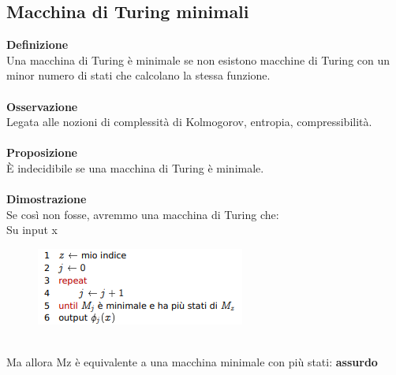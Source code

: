 \subsection{Macchina di Turing minimali}
\textbf{Definizione}\\
Una macchina di Turing è minimale se non esistono macchine di Turing con un minor numero di stati che calcolano la stessa funzione.\\\\
\textbf{Osservazione}\\
Legata alle nozioni di complessità di Kolmogorov, entropia, compressibilità.\\\\
\textbf{Proposizione}\\
È indecidibile se una macchina di Turing è minimale.\\\\
\textbf{Dimostrazione}\\
Se così non fosse, avremmo una macchina di Turing che:\\
Su input x
\begin{figure}[htp]
    \includegraphics[scale=0.8]{tesi_stile/img/cap6f9.png}
\end{figure}
\\Ma allora Mz è equivalente a una macchina minimale con più stati: \textbf{assurdo}